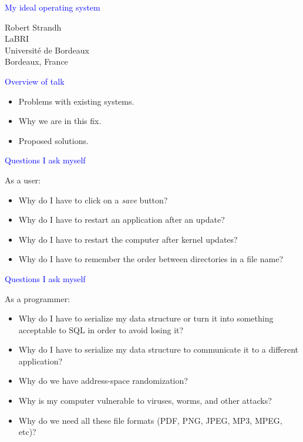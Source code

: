 \documentclass{slides}
\newcommand{\ti}[1]{\begin{center}\Large{\textcolor{blue}{#1}}\end{center}}
\begin{document}
\landscape
\setlength{\oddsidemargin}{1cm}
\setlength{\evensidemargin}{1cm}
\setlength{\marginparwidth}{1cm}
\setlength{\parskip}{0.5cm}
\setlength{\parindent}{0cm}
\begin{slide}\ti{My ideal operating system}
\vskip 0.5cm
\begin{center}
Robert Strandh \\
LaBRI \\
Université de Bordeaux \\
Bordeaux, France
\end{center}
\vfill\end{slide}
\begin{slide}\ti{Overview of talk}
\vskip 0.5cm
  \begin{itemize}
  \item Problems with existing systems.
  \item Why we are in this fix.
  \item Proposed solutions.
  \end{itemize}

\vfill\end{slide}
\begin{slide}\ti{Questions I ask myself}
\vskip 0.5cm
As a user:

  \begin{itemize}
  \item Why do I have to click on a \emph{save} button?
  \item Why do I have to restart an application after an update?
  \item Why do I have to restart the computer after kernel updates?
  \item Why do I have to remember the order between directories in a
    file name?
  \end{itemize}

\vfill\end{slide}
\begin{slide}\ti{Questions I ask myself}
\vskip 0.5cm
As a programmer:

  \begin{itemize}
  \item Why do I have to serialize my data structure or turn it into
    something acceptable to SQL in order to avoid losing it?
  \item Why do I have to serialize my data structure to communicate it
    to a different application?
  \item Why do we have address-space randomization?
  \item Why is my computer vulnerable to viruses, worms, and other
    attacks?
  \item Why do we need all these file formats (PDF, PNG, JPEG, MP3,
    MPEG, etc)?
  \end{itemize}

\vfill\end{slide}
\end{document}
